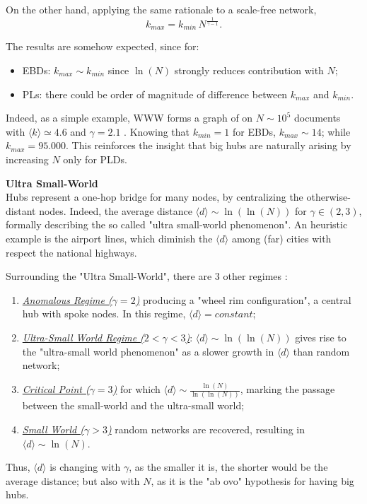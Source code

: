 \documentclass[a4paper,10pt,twoside]{book} %
\theoremstyle{definition}
\begin{document}
On the other hand, applying the same rationale to a scale-free network, 
\begin{equation}
	k_{max} = k_{min}\,N^{\frac{1}{\gamma-1}}.
	\label{eq:SFkmax_up}
\end{equation}

The results are somehow expected, since for:
\begin{itemize}
	\item EBDs: $k_{max} \sim k_{min}$ since $\ln(N)$ strongly reduces contribution with $N$;
	\item PLs: there could be order of magnitude of difference between $k_{max}$ and $k_{min}$.
\end{itemize} 
Indeed, as a simple example, WWW forms a graph of on $N \sim 10^5$ documents with $\langle k \rangle \simeq 4.6$ and $\gamma = 2.1$ \cite{barabasi::2016networkbook}. 
Knowing that $k_{min} = 1$ for EBDs, $k_{max} \sim 14$; while $k_{max} = 95.000$. 
This reinforces the insight that big hubs are naturally arising by increasing $N$ only for PLDs.
\label{sec:SFProperties_up}

{\large \textbf{Ultra Small-World}} \\
Hubs represent a one-hop bridge for many nodes, by centralizing the otherwise-distant nodes. Indeed, the average distance $\langle d \rangle \sim \ln(\ln(N))$ for $\gamma \in (2,3)$, formally describing the so called "ultra small-world phenomenon". An heuristic example is the airport lines, which diminish the \(\langle d \rangle\) among (far) cities with respect the national highways.

Surrounding the "Ultra Small-World", there are $3$ other regimes
\cite{Cohen:2003_SFUSW}:
\begin{enumerate}
	\item \underline{\textit{Anomalous Regime ($\gamma = 2$)}} producing a "wheel rim configuration", 
	a central hub with spoke nodes. In this regime, $\langle d \rangle = constant$;
	\item \underline{\textit{Ultra-Small World Regime ($2 < \gamma < 3$)}}: $\langle d \rangle \sim \ln(\ln(N))$ gives rise to the "ultra-small world phenomenon" as a slower growth in $\langle d \rangle$ than random network;
	\item \underline{\textit{Critical Point ($\gamma = 3$)}} for which $\langle d \rangle \sim \frac{\ln(N)}{\ln(\ln(N))}$, marking the passage between the small-world and the ultra-small world;
	\item \underline{\textit{Small World ($\gamma > 3$)}} random networks are recovered, resulting in $\langle d \rangle \sim \ln(N)$.
\end{enumerate}
Thus, \(\langle d \rangle\) is changing with $\gamma$, as the smaller it is, the shorter would be the average distance; but also with $N$, as it is the "ab ovo" hypothesis for having big hubs.
\end{document}
